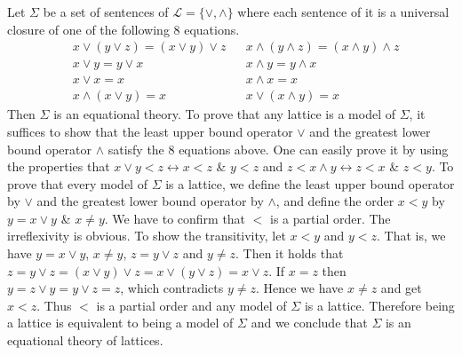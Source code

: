\documentclass[12pt]{article}
\theoremstyle{definition}
\newenvironment{customthm}[1]
  {\renewcommand\theinnercustomthm{#1}\innercustomthm}
  {\endinnercustomthm}
\begin{document}
\begin{customthm}{II.15.3} Let $\Sigma$ be a set of sentences of $\mathcal{L}=\{\vee,\wedge\}$ where each sentence of it is a universal closure of one of the following 8 equations.
\begin{align*}
  &x\vee(y\vee z)=(x\vee y)\vee z &&x\wedge(y\wedge z)=(x\wedge y)\wedge z \\
  &x\vee y=y\vee x &&x\wedge y=y\wedge x \\
  &x\vee x=x &&x\wedge x=x \\
  &x\wedge(x\vee y)=x &&x\vee(x\wedge y)=x
\end{align*}
Then $\Sigma$ is an equational theory. To prove that any lattice is a model of $\Sigma$, it suffices to show that the least upper bound operator $\vee$ and the greatest lower bound operator $\wedge$ satisfy the 8 equations above. One can easily prove it by using the properties that $x\vee y<z\leftrightarrow x<z$ \& $y<z$ and $z<x\wedge y\leftrightarrow z<x$ \& $z<y$. To prove that every model of $\Sigma$ is a lattice, we define the least upper bound operator by $\vee$ and the greatest lower bound operator by $\wedge$, and define the order $x<y$ by $y=x\vee y$ \& $x\neq y$. We have to confirm that $<$ is a partial order. The irreflexivity is obvious. To show the transitivity, let $x<y$ and $y<z$. That is, we have $y=x\vee y$, $x\neq y$, $z=y\vee z$ and $y\neq z$. Then it holds that $z=y\vee z=(x\vee y)\vee z=x\vee(y\vee z)=x\vee z$. If $x=z$ then $y=z\vee y=y\vee z=z$, which contradicts $y\neq z$. Hence we have $x\neq z$ and get $x<z$. Thus $<$ is a partial order and any model of $\Sigma$ is a lattice. Therefore being a lattice is equivalent to being a model of $\Sigma$ and we conclude that $\Sigma$ is an equational theory of lattices.
\end{customthm}
\end{document}
